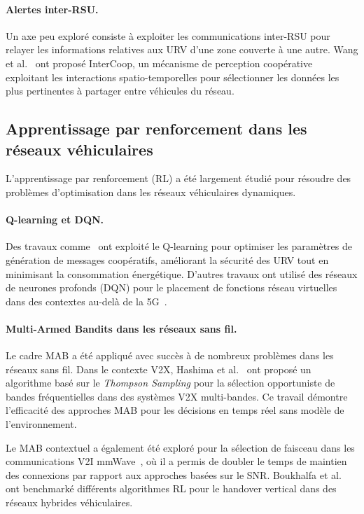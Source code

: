 \documentclass[12pt,a4paper]{article}
\begin{document}
\paragraph{Alertes inter-RSU.}
Un axe peu exploré consiste à exploiter les communications inter-RSU pour relayer
les informations relatives aux URV d'une zone couverte à une autre. Wang et
al.~\cite{intercoop} ont proposé InterCoop, un mécanisme de perception coopérative
exploitant les interactions spatio-temporelles pour sélectionner les données les
plus pertinentes à partager entre véhicules du réseau.

\subsection{Apprentissage par renforcement dans les réseaux véhiculaires}

L'apprentissage par renforcement (RL) a été largement étudié pour résoudre des
problèmes d'optimisation dans les réseaux véhiculaires dynamiques.

\paragraph{Q-learning et DQN.}
Des travaux comme~\cite{zoghlami2024} ont exploité le Q-learning pour optimiser
les paramètres de génération de messages coopératifs, améliorant la sécurité des
URV tout en minimisant la consommation énergétique. D'autres travaux ont utilisé
des réseaux de neurones profonds (DQN) pour le placement de fonctions réseau
virtuelles dans des contextes au-delà de la 5G~\cite{demendoza2023}.

\paragraph{Multi-Armed Bandits dans les réseaux sans fil.}
Le cadre MAB a été appliqué avec succès à de nombreux problèmes dans les réseaux
sans fil. Dans le contexte V2X, Hashima et al.~\cite{hashima2023} ont proposé un
algorithme basé sur le \textit{Thompson Sampling} pour la sélection opportuniste
de bandes fréquentielles dans des systèmes V2X multi-bandes. Ce travail démontre
l'efficacité des approches MAB pour les décisions en temps réel sans modèle de
l'environnement.

Le MAB contextuel a également été exploré pour la sélection de faisceau dans les
communications V2I mmWave~\cite{cmab_v2i}, où il a permis de doubler le temps de
maintien des connexions par rapport aux approches basées sur le SNR. Boukhalfa
et al.~\cite{boukhalfa2024} ont benchmarké différents algorithmes RL pour le
handover vertical dans des réseaux hybrides véhiculaires.
\end{document}

